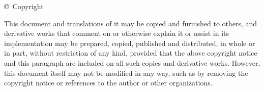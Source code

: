 \begin{flushleft}
    \copyright~Copyright~\the\year~\DICTDocAuthor
\end{flushleft}
This document and translations of it may be copied and furnished to others, and derivative works that comment on or otherwise explain it or assist in its implementation may be prepared, copied, published and distributed, in whole or in part, without restriction of any kind, provided that the above copyright notice and this paragraph are included on all such copies and derivative works. However, this document itself may not be modified in any way, such as by removing the copyright notice or references to the author or other organizations.